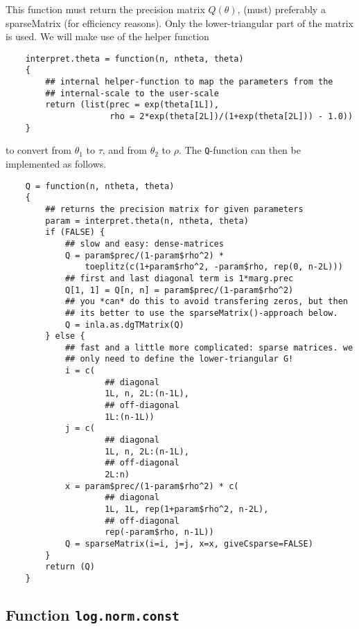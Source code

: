 \documentclass[a4paper,11pt]{article}
\begin{document}
This function must return the precision matrix $Q(\theta)$, (must)
preferably a sparseMatrix (for efficiency reasons). Only the
lower-triangular part of the matrix is used. We will make use of the
helper function
\begin{verbatim}
    interpret.theta = function(n, ntheta, theta)
    {
        ## internal helper-function to map the parameters from the
        ## internal-scale to the user-scale
        return (list(prec = exp(theta[1L]),
                     rho = 2*exp(theta[2L])/(1+exp(theta[2L])) - 1.0))
    }
\end{verbatim}
to convert from $\theta_{1}$ to $\tau$, and from $\theta_{2}$ to
$\rho$.  The \texttt{Q}-function can then be implemented as follows.
\begin{verbatim}
    Q = function(n, ntheta, theta)
    {
        ## returns the precision matrix for given parameters
        param = interpret.theta(n, ntheta, theta)
        if (FALSE) {
            ## slow and easy: dense-matrices
            Q = param$prec/(1-param$rho^2) *
                toeplitz(c(1+param$rho^2, -param$rho, rep(0, n-2L)))
            ## first and last diagonal term is 1*marg.prec
            Q[1, 1] = Q[n, n] = param$prec/(1-param$rho^2)
            ## you *can* do this to avoid transfering zeros, but then
            ## its better to use the sparseMatrix()-approach below.
            Q = inla.as.dgTMatrix(Q)
        } else {
            ## fast and a little more complicated: sparse matrices. we
            ## only need to define the lower-triangular G!
            i = c(
                    ## diagonal
                    1L, n, 2L:(n-1L),
                    ## off-diagonal
                    1L:(n-1L))
            j = c(
                    ## diagonal
                    1L, n, 2L:(n-1L),
                    ## off-diagonal
                    2L:n)
            x = param$prec/(1-param$rho^2) * c(
                    ## diagonal
                    1L, 1L, rep(1+param$rho^2, n-2L),
                    ## off-diagonal
                    rep(-param$rho, n-1L))
            Q = sparseMatrix(i=i, j=j, x=x, giveCsparse=FALSE)
        }            
        return (Q)
    }
\end{verbatim}

\subsection*{Function \texttt{log.norm.const}}
\end{document}
